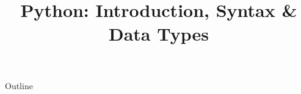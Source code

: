 \documentclass[xcolor=dvipsnames,compress,t,pdf]{beamer}
\title[\insertframenumber /\inserttotalframenumber]{Python: Introduction, Syntax \& Data Types}
\begin{document}
	\begin{frame}
	\titlepage
	\end{frame}

	\begin{frame}{Outline}
	    \tableofcontents
	\end{frame}

	
	
	
\end{document}

